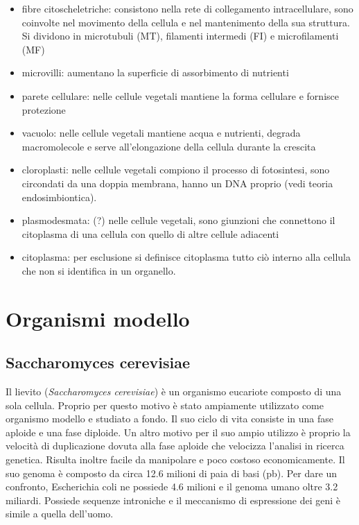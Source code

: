 \begin{itemize}
    \item fibre citoscheletriche: consistono nella rete di collegamento intracellulare, sono coinvolte nel movimento della cellula e nel mantenimento della sua struttura. 
    Si dividono in microtubuli (MT), filamenti intermedi (FI) e microfilamenti (MF)
    \item microvilli: aumentano la superficie di assorbimento di nutrienti \\
    \item parete cellulare: nelle cellule vegetali mantiene la forma cellulare e fornisce protezione
    \item vacuolo: nelle cellule vegetali mantiene acqua e nutrienti, degrada macromolecole e serve all'elongazione della cellula durante la crescita
    \item cloroplasti: nelle cellule vegetali compiono il processo di fotosintesi, sono circondati da una doppia membrana, hanno un DNA proprio (vedi teoria endosimbiontica).
    \item plasmodesmata: (?) nelle cellule vegetali, sono giunzioni che connettono il citoplasma di una cellula con quello di altre cellule adiacenti
    \item citoplasma: per esclusione si definisce citoplasma tutto ciò interno alla cellula che non si identifica in un organello.
    
\end{itemize}

       

\section{Organismi modello}

\subsection{Saccharomyces cerevisiae}
Il lievito (\textit{Saccharomyces cerevisiae}) è un organismo eucariote composto di una sola cellula. Proprio per questo motivo è stato ampiamente utilizzato come organismo modello e studiato a fondo. 
Il suo ciclo di vita consiste in una fase aploide e una fase diploide. Un altro motivo per il suo ampio utilizzo è proprio la velocità di duplicazione dovuta alla fase aploide che velocizza l'analisi in ricerca genetica. Risulta inoltre facile da manipolare e poco costoso economicamente. 
Il suo genoma è composto da circa 12.6 milioni di paia di basi (pb). Per dare un confronto, Escherichia coli ne possiede 4.6 milioni e il genoma umano oltre 3.2 miliardi. Possiede sequenze introniche e il meccanismo di espressione dei geni è simile a quella dell'uomo.

